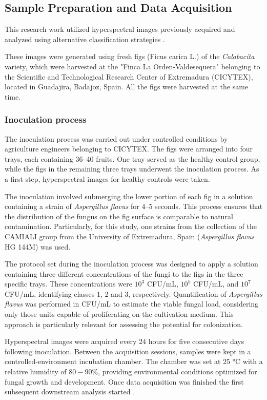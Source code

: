\documentclass[runningheads]{llncs}
\begin{document}
\subsection{Sample Preparation and Data Acquisition}

This research work utilized hyperspectral images previously acquired and analyzed using alternative classification strategies \cite{cruz-carrasco_detection_2024}. 

These images were generated using fresh figs (Ficus carica L.) of the \textit{Calabacita} variety, which were harvested at the "Finca La Orden-Valdesequera" belonging to the Scientific and Technological Research Center of Extremadura (CICYTEX), located in Guadajira, Badajoz, Spain. All the figs were harvested at the same time.

\subsubsection{Inoculation process}
The inoculation process was carried out under controlled conditions by agriculture engineers belonging to CICYTEX. The figs were arranged into four trays, each containing 36--40 fruits. One tray served as the healthy control group, while the figs in the remaining three trays underwent the inoculation process. 
As a first step, hyperspectral images for healthy controls were taken.

The inoculation involved submerging the lower portion of each fig in a solution containing a strain of \textit{Aspergillus flavus} for 4--5 seconds. This process ensures that the distribution of the fungus on the fig surface is comparable to natural contamination. Particularly, for this study, one strains from the collection of the CAMIALI group from the University of Extremadura, Spain (\textit{Aspergillus flavus} HG 144M) was used.

The protocol set during the inoculation process was designed to apply a solution containing three different concentrations of the fungi to the figs in the three specific trays. These concentrations were $10^3$ CFU/mL,  $10^5$ CFU/mL, and $10^7$ CFU/mL, identifying classes 1, 2 and 3, respectively. Quantification of \textit{Aspergillus flavus} was performed in CFU/mL to estimate the viable fungal load, considering only those units capable of proliferating on the cultivation medium. This approach is particularly relevant for assessing the potential for colonization.

Hyperspectral images were acquired every 24 hours for five consecutive days following inoculation. Between the acquisition sessions, samples were kept in a controlled-environment incubation chamber. The chamber was set at 25 °C with a relative humidity of $80-90\%$, providing environmental conditions optimized for fungal growth and development. Once data acquisition was finished the first subsequent downstream analysis started \cite{cruz-carrasco_detection_2024}.
\end{document}
